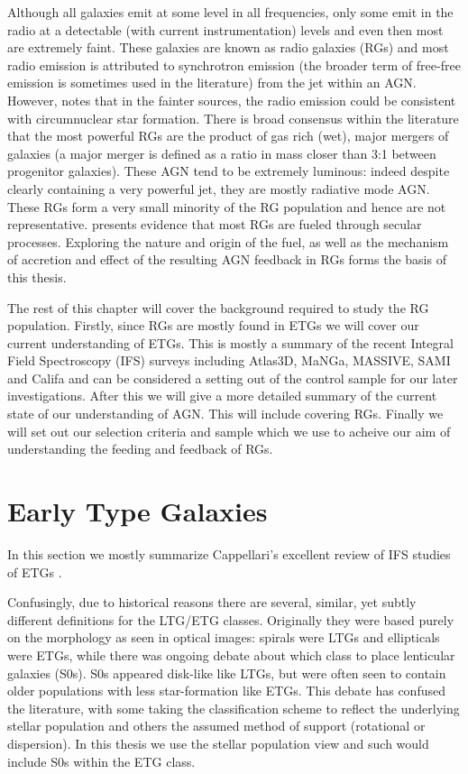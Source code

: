 Although all galaxies emit at some level in all frequencies, only some emit in the radio at a detectable (with current instrumentation) levels and even then most are extremely faint. These galaxies are known as radio galaxies (RGs) and most radio emission is attributed to synchrotron emission (the broader term of free-free emission is sometimes used in the literature) from the jet within an AGN. However, \citet{Nyland2016} notes that in the fainter sources, the radio emission could be consistent with circumnuclear star formation. There is broad consensus within the literature that the most powerful RGs are the product of gas rich (wet), major mergers of galaxies (a major merger is defined as a ratio in mass closer than 3:1 between progenitor galaxies). These AGN tend to be extremely luminous: indeed despite clearly containing a very powerful jet, they are mostly radiative mode AGN. These RGs form a very small minority of the RG population and hence are not representative. \citet{Heckman2014} presents evidence that most RGs are fueled through secular processes. Exploring the nature and origin of the fuel, as well as the mechanism of accretion and effect of the resulting AGN feedback in RGs forms the basis of this thesis. 

The rest of this chapter will cover the background required to study the RG population. Firstly, since RGs are mostly found in ETGs we will cover our current understanding of ETGs. This is mostly a summary of the recent Integral Field Spectroscopy (IFS) surveys including Atlas3D, MaNGa, MASSIVE, SAMI and Califa and can be considered a setting out of the control sample for our later investigations. After this we will give a more detailed summary of the current state of our understanding of AGN. This will include covering RGs. Finally we will set out our selection criteria and sample which we use to acheive our aim of understanding the feeding and feedback of RGs.

\section{Early Type Galaxies}
	\label{sec:ETG}
	In this section we mostly summarize Cappellari's excellent review of IFS studies of ETGs \citep{Cappellari2016}. 

	Confusingly, due to historical reasons there are several, similar, yet subtly different definitions for the LTG/ETG classes. Originally they were based purely on the morphology as seen in optical images: spirals were LTGs and ellipticals were ETGs, while there was ongoing debate about which class to place lenticular galaxies (S0s). S0s appeared disk-like like LTGs, but were often seen to contain older populations with less star-formation like ETGs. This debate has confused the literature, with some taking the classification scheme to reflect the underlying stellar population and others the assumed method of support (rotational or dispersion). In this thesis we use the stellar population view and such would include S0s within the ETG class.

